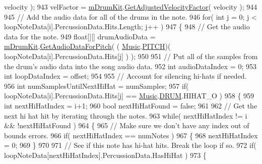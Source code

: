 \begin{DoxyCode}
      velocity );
943             velFactor = \hyperlink{group___v_i_m_priv_ga0bc7c9f776b0d2dae0ccb1f1ee5f2143}{mDrumKit}.\hyperlink{group___v_i_base_pub_func_gae638c68bd0e79d0b99495be69e50f49d}{GetAdjustedVelocityFactor}( velocity );
944 
945             \textcolor{comment}{// Add the audio data for all of the drums in the note.}
946             \textcolor{keywordflow}{for}( \textcolor{keywordtype}{int} j = 0; j < loopNoteData[i].PercussionData.Hits.Length; j++ )
947             \{
948                 \textcolor{comment}{// Get the audio data for the note.}
949                 \textcolor{keywordtype}{float}[][] drumAudioData = \hyperlink{group___v_i_m_priv_ga0bc7c9f776b0d2dae0ccb1f1ee5f2143}{mDrumKit}.\hyperlink{group___v_i_base_pub_func_gaf715f7c3bbd2f1a2fa543b2f0684f8a6}{GetAudioDataForPitch}( (
      \hyperlink{class_music}{Music}.\hyperlink{group___music_enums_ga508f69b199ea518f935486c990edac1d}{PITCH})( loopNoteData[i].PercussionData.Hits[j] ) );
950 
951                 \textcolor{comment}{// Put all of the samples from the drum's audio data into the song audio data.}
952                 \textcolor{keywordtype}{int} audioDataIndex = 0;
953                 \textcolor{keywordtype}{int} loopDataIndex = offset;
954 
955                 \textcolor{comment}{// Account for silencing hi-hats if needed.}
956                 \textcolor{keywordtype}{int} numSamplesUntilNextHiHat = numSamples;
957                 \textcolor{keywordflow}{if}( loopNoteData[i].PercussionData.Hits[j] == \hyperlink{class_music}{Music}.\hyperlink{group___music_enums_gade475b4382c7066d1af13e7c13c029b6}{DRUM}.HIHAT\_O )
958                 \{
959                     \textcolor{keywordtype}{int} nextHiHatIndex = i+1;
960                     \textcolor{keywordtype}{bool} nextHiHatFound = \textcolor{keyword}{false};
961 
962                     \textcolor{comment}{// Get the next hi hat hit by iterating through the notes.}
963                     \textcolor{keywordflow}{while}( nextHiHatIndex != i && !nextHiHatFound )
964                     \{
965                         \textcolor{comment}{// Make sure we don't have any index out of bounds errors.}
966                         \textcolor{keywordflow}{if}( nextHiHatIndex == numNotes )
967                         \{
968                             nextHiHatIndex = 0;
969                         \}
970 
971                         \textcolor{comment}{// See if this note has hi-hat hits. Break the loop if so.}
972                         \textcolor{keywordflow}{if}( loopNoteData[nextHiHatIndex].PercussionData.HasHiHat )
973                         \{

\end{DoxyCode}
